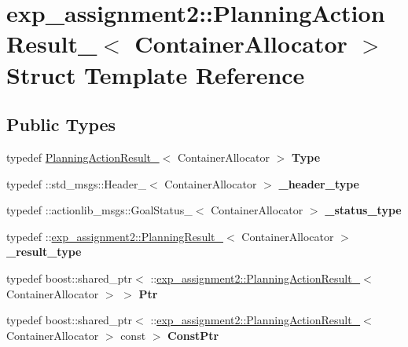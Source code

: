 \hypertarget{structexp__assignment2_1_1PlanningActionResult__}{}\section{exp\+\_\+assignment2\+:\+:Planning\+Action\+Result\+\_\+$<$ Container\+Allocator $>$ Struct Template Reference}
\label{structexp__assignment2_1_1PlanningActionResult__}
\subsection*{Public Types}
\begin{DoxyCompactItemize}
\item 
\mbox{\label{structexp__assignment2_1_1PlanningActionResult___ae593486c77b11d74e8af03412a03fa9c}} 
typedef \hyperlink{structexp__assignment2_1_1PlanningActionResult__}{Planning\+Action\+Result\+\_\+}$<$ Container\+Allocator $>$ {\bfseries Type}
\item 
\mbox{\label{structexp__assignment2_1_1PlanningActionResult___a1fa537df62a296dc86d37b01ea8f8cda}} 
typedef \+::std\+\_\+msgs\+::\+Header\+\_\+$<$ Container\+Allocator $>$ {\bfseries \+\_\+header\+\_\+type}
\item 
\mbox{\label{structexp__assignment2_1_1PlanningActionResult___ae1ffeb17000fd2507c14a9b010fa0b5b}} 
typedef \+::actionlib\+\_\+msgs\+::\+Goal\+Status\+\_\+$<$ Container\+Allocator $>$ {\bfseries \+\_\+status\+\_\+type}
\item 
\mbox{\label{structexp__assignment2_1_1PlanningActionResult___a8bffff319ae3d81726959665dce13d31}} 
typedef \+::\hyperlink{structexp__assignment2_1_1PlanningResult__}{exp\+\_\+assignment2\+::\+Planning\+Result\+\_\+}$<$ Container\+Allocator $>$ {\bfseries \+\_\+result\+\_\+type}
\item 
\mbox{\label{structexp__assignment2_1_1PlanningActionResult___a9c88de5f8a2124676aa5afb30c9f261d}} 
typedef boost\+::shared\+\_\+ptr$<$ \+::\hyperlink{structexp__assignment2_1_1PlanningActionResult__}{exp\+\_\+assignment2\+::\+Planning\+Action\+Result\+\_\+}$<$ Container\+Allocator $>$ $>$ {\bfseries Ptr}
\item 
\mbox{\label{structexp__assignment2_1_1PlanningActionResult___a5dcb635377167536d5a2267c26df508c}} 
typedef boost\+::shared\+\_\+ptr$<$ \+::\hyperlink{structexp__assignment2_1_1PlanningActionResult__}{exp\+\_\+assignment2\+::\+Planning\+Action\+Result\+\_\+}$<$ Container\+Allocator $>$ const  $>$ {\bfseries Const\+Ptr}
\end{DoxyCompactItemize}
